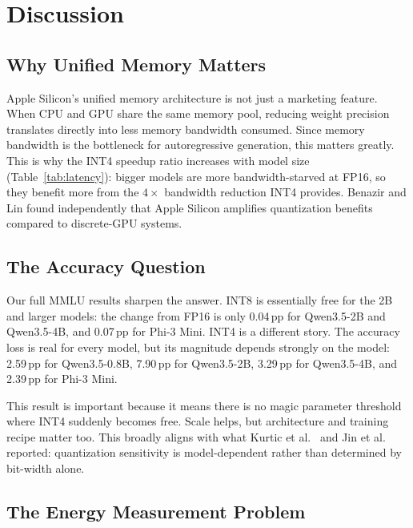 \documentclass[journal]{IEEEtran}
\begin{document}
\section{Discussion}

\subsection{Why Unified Memory Matters}

Apple Silicon's unified memory architecture is not just a marketing feature. When CPU and GPU share the same memory pool, reducing weight precision translates directly into less memory bandwidth consumed. Since memory bandwidth is the bottleneck for autoregressive generation, this matters greatly. This is why the INT4 speedup ratio increases with model size (Table~\ref{tab:latency}): bigger models are more bandwidth-starved at FP16, so they benefit more from the $4\times$ bandwidth reduction INT4 provides. Benazir and Lin \cite{benazir2025profiling} found independently that Apple Silicon amplifies quantization benefits compared to discrete-GPU systems.

\subsection{The Accuracy Question}

Our full MMLU results sharpen the answer. INT8 is essentially free for the 2B and larger models: the change from FP16 is only 0.04\,pp for Qwen3.5-2B and Qwen3.5-4B, and 0.07\,pp for Phi-3 Mini. INT4 is a different story. The accuracy loss is real for every model, but its magnitude depends strongly on the model: 2.59\,pp for Qwen3.5-0.8B, 7.90\,pp for Qwen3.5-2B, 3.29\,pp for Qwen3.5-4B, and 2.39\,pp for Phi-3 Mini.

This result is important because it means there is no magic parameter threshold where INT4 suddenly becomes free. Scale helps, but architecture and training recipe matter too. This broadly aligns with what Kurtic et al.\ \cite{kurtic2024give} and Jin et al.\ \cite{jin2024comprehensive} reported: quantization sensitivity is model-dependent rather than determined by bit-width alone.

\subsection{The Energy Measurement Problem}
\end{document}
